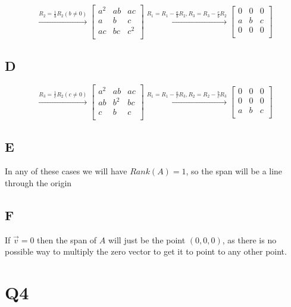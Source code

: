 \documentclass{report}
\begin{document}
\[
	\xrightarrow{
		R_2 = \frac{1}{b}R_2 (b \neq 0)
	}
	\begin{bmatrix}
		a^2 & ab & ac  \\
		a   & b  & c   \\
		ac  & bc & c^2 \\
	\end{bmatrix}
	\xrightarrow{R_1 = R_1 - \frac{a}{b}R_2, R_3 = R_3 - \frac{c}{b}R_2}
	\begin{bmatrix}
		0 & 0 & 0 \\
		a & b & c \\
		0 & 0 & 0 \\
	\end{bmatrix}
\]

\subsection*{D}
\[
	\xrightarrow{
		R_3 = \frac{1}{c}R_2 (c \neq 0)
	}
	\begin{bmatrix}
		a^2 & ab  & ac \\
		ab  & b^2 & bc \\
		c   & b   & c  \\
	\end{bmatrix}
	\xrightarrow{R_1 = R_1 - \frac{a}{c}R_3, R_2 = R_2 - \frac{b}{c}R_3}
	\begin{bmatrix}
		0 & 0 & 0 \\
		0 & 0 & 0 \\
		a & b & c \\
	\end{bmatrix}
\]

\subsection*{E}

In any of these cases we will have \(Rank(A)=1\), so the span will be a line through the origin

\subsection*{F}

If $\vec{v} = 0$ then the span of $A$ will just be the point $(0,0,0)$, as there is no possible way to multiply the zero vector to get it to point to any other point.

\section*{Q4}
\end{document}
